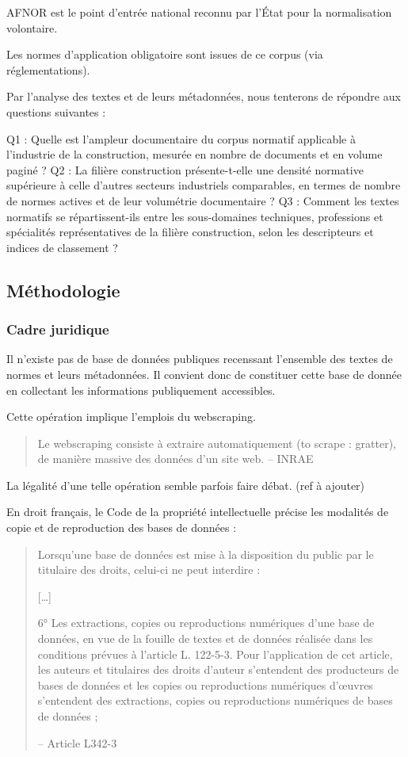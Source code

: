 \documentclass[a4paper,12pt]{article}
\begin{document}
AFNOR est le point d’entrée national reconnu par l’État pour la normalisation volontaire.

Les normes d’application obligatoire sont issues de ce corpus (via réglementations).

Par l'analyse des textes et de leurs métadonnées, nous tenterons de répondre aux questions suivantes :

Q1 : Quelle est l’ampleur documentaire du corpus normatif applicable à l’industrie de la construction, mesurée en nombre de documents et en volume paginé ?
Q2 : La filière construction présente-t-elle une densité normative supérieure à celle d’autres secteurs industriels comparables, en termes de nombre de normes actives et de leur volumétrie documentaire ?
Q3 : Comment les textes normatifs se répartissent-ils entre les sous-domaines techniques, professions et spécialités représentatives de la filière construction, selon les descripteurs et indices de classement ?
\subsection{Méthodologie}
\label{sec:org7c14f04}
\subsubsection{Cadre juridique}
\label{sec:org15af1b8}
Il n'existe pas de base de données publiques recenssant l'ensemble des textes de normes et leurs métadonnées. Il convient donc de constituer cette base de donnée en collectant les informations publiquement accessibles.

Cette opération implique l'emplois du webscraping.

\begin{quote}
Le webscraping consiste à extraire automatiquement (to scrape : gratter), de manière massive des données d'un site web. -- INRAE\autocite{quesnevilleRecommandationsUsagesWebscraping2024}
\end{quote}

La légalité d'une telle opération semble parfois faire débat. (ref à ajouter)

En droit français, le Code de la propriété intellectuelle précise les modalités de copie et de reproduction des bases de données :
\begin{quote}
Lorsqu'une base de données est mise à la disposition du public par le titulaire des droits, celui-ci ne peut interdire :

{[}\ldots{}]

6° Les extractions, copies ou reproductions numériques d'une base de données, en vue de la fouille de textes et de données réalisée dans les conditions prévues à l'article L. 122-5-3. Pour l'application de cet article, les auteurs et titulaires des droits d'auteur s'entendent des producteurs de bases de données et les copies ou reproductions numériques d'œuvres s'entendent des extractions, copies ou reproductions numériques de bases de données ;

-- Article L342-3\autocite{CodeProprieteIntellectuelle}
\end{quote}
\end{document}
